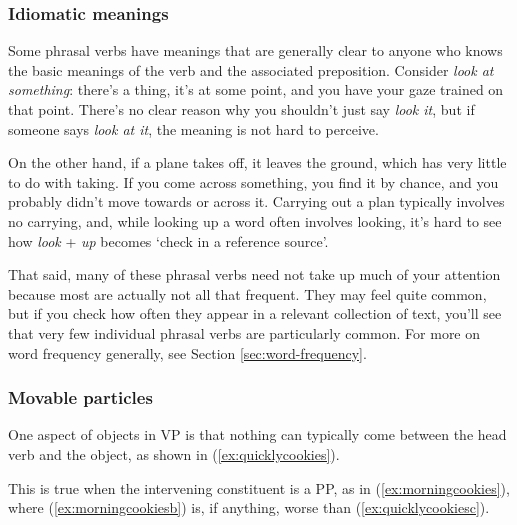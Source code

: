 \subsubsection*{Idiomatic meanings}
Some phrasal verbs have meanings that are generally clear to anyone who knows
the basic meanings of the verb and the associated preposition. Consider \textit{look at
something}: there's a thing, it's at some point, and you have your gaze trained
on that point. There's no clear reason why you shouldn't just say \textit{look it}, but if
someone says \textit{look at it}, the meaning is not hard to perceive. 

On the other hand, if a plane takes off, it leaves the ground, which has very
little to do with taking. If you come across something, you find it by chance,
and you probably didn't move towards or across it. Carrying out a plan typically
involves no carrying, and, while looking up a word often involves looking, it's
hard to see how \textit{look} + \textit{up} becomes `check in a reference source'.

That said, many of these phrasal verbs need not take up much of your attention
because most are actually not all that frequent. They may feel quite common, but
if you check how often they appear in a relevant collection of text, you'll see that
very few individual phrasal verbs are particularly common. For more on word
frequency generally, see Section \ref{sec:word-frequency}.

\subsubsection*{Movable particles}

One aspect of objects in VP is that nothing can typically come between the head verb and the object, as shown in (\ref{ex:quicklycookies}).

\ea
    \label{ex:quicklycookiesa}
    \label{ex:quicklycookiesb}
    \label{ex:quicklycookiesc}
    \label{ex:quicklycookiesd}
    \z\label{ex:quicklycookies}
\z

\noindent
This is true when the intervening constituent  is a PP, as in  (\ref{ex:morningcookies}), where (\ref{ex:morningcookiesb}) is, if anything, worse than (\ref{ex:quicklycookiesc}).

